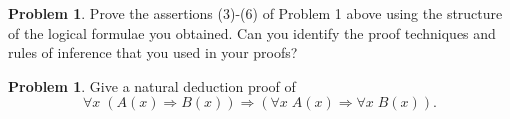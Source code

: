 \documentclass[12pt,english]{amsart}
\theoremstyle{plain}
\theoremstyle{definition}
\theoremstyle{plain}
\theoremstyle{plain}
\theoremstyle{remark}
\newcounter{problems}
\theoremstyle{definition}
\newtheorem{problem}[problems]{Problem}
\theoremstyle{remark}
\newtheorem*{solution}{Solution}
\renewcommand{\implies}{\Rightarrow}
\begin{document}
\begin{problem} Prove the assertions (3)-(6) of Problem 1 above using the structure of the logical formulae you obtained. 
Can you identify the proof techniques and rules of inference that you used in your proofs?
\end{problem}

		


\begin{problem}
Give a natural deduction proof of
\[ \forall x \; (A(x) \implies B(x)) \implies (\forall x \; A(x) \implies \forall x \; B(x)). \]
\end{problem}
\end{document}
